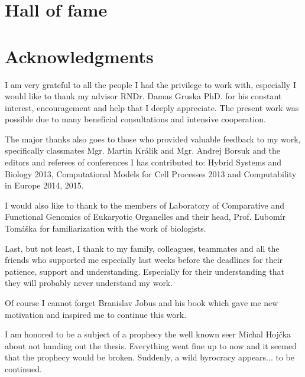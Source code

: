 \ifdefined\godzilla
  \chapter*{Hall of fame}
\else
  \chapter*{Acknowledgments}
\fi

I am very grateful to all the people I had the privilege to work with, especially I would like to thank my advisor RNDr. Damas Gruska PhD. for his constant interest, encouragement and help that I deeply appreciate.
The present work was possible due to many beneficial consultations and intensive cooperation.

The major thanks also goes to those who provided valuable feedback to my work, specifically classmates Mgr. Martin Králik and Mgr. Andrej Borsuk and the editors and referees of conferences I has contributed to: Hybrid Systems and Biology 2013, Computational Models for Cell Processes 2013 and Computability in Europe 2014, 2015.

I would also like to thank to the members of Laboratory of Comparative and Functional Genomics of Eukaryotic Organelles and their head, Prof. Ľubomír Tomáška for familiarization with the work of biologists.

Last, but not least, I thank to my family, colleagues, teammates and all the friends who supported me especially last weeks before the deadlines for their patience, support and understanding.
\ifdefined\godzilla
  Especially for their understanding that they will probably never understand my work.

  Of course I cannot forget Branislav Jobus and his book \cite{Jobus10Ancijas} which gave me new motivation and inspired me to continue this work.

  I am honored to be a subject of a prophecy the well known seer Michal Hojčka about not handing out the thesis. Everything went fine up to now and it seemed that the prophecy would be broken. Suddenly, a wild byrocracy appears... to be continued.  
\fi
